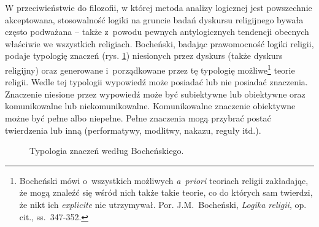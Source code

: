 W przeciwieństwie do filozofii, w której metoda analizy logicznej jest powszechnie akceptowana, stosowalność logiki na gruncie badań dyskursu religijnego bywała często podważana -- także z~powodu pewnych antylogicznych tendencji obecnych właściwie we wszystkich religiach.
Bocheński, badając prawomocność logiki religii, podaje typologię znaczeń (rys. \ref{sil-boch-typ}) niesionych przez dyskurs (także dyskurs religijny) oraz generowane i~porządkowane przez tę typologię możliwe\footnote{Bocheński mówi o~wszystkich możliwych \textit{a~priori} teoriach religii zakładając, że mogą znaleźć się wśród nich także takie teorie, co do których sam twierdzi, że nikt ich \textit{explicite} nie utrzymywał. Por. J.M.~Bocheński, \textit{Logika religii}, op. cit., ss.~347-352.} teorie religii. Wedle tej typologii wypowiedź może posiadać lub nie posiadać znaczenia. Znaczenie niesione przez wypowiedź może być subiektywne lub obiektywne oraz komunikowalne lub niekomunikowalne. Komunikowalne znaczenie obiektywne możne być pełne albo niepełne. Pełne znaczenia mogą przybrać postać twierdzenia lub inną (performatywy, modlitwy, nakazu, reguły itd.).
\begin{figure}[H]
\begin{center}

\caption[Typologia znaczeń według Bocheńskiego]{Typologia znaczeń według Bocheńskiego\footnotemark.}\label{sil-boch-typ}
\end{center}
\end{figure}


